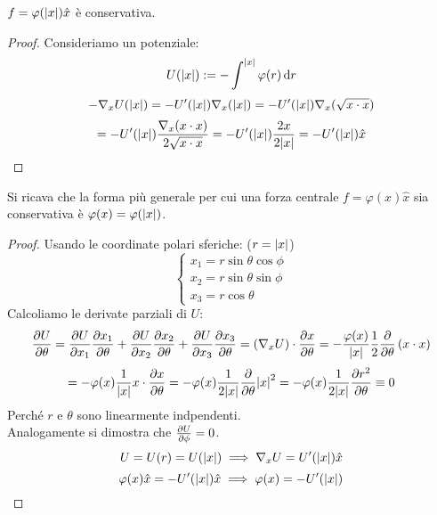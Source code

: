 \begin{proposition}
    $f= \varphi(\abs{x})\hat{x}$ è conservativa.    
\end{proposition}
\begin{proof}
    Consideriamo un potenziale:
    \begin{equation}
        U(\abs{x}):=-\int^\abs{x}\varphi(r)\dd{r}
    \end{equation}
    \begin{equation*}
        -\nabla_x U(\abs{x}) = -U'(\abs{x}) \nabla_x (\abs{x}) = -U'(\abs{x}) \nabla_x (\sqrt{x \cdot x}) 
    \end{equation*}
    \begin{equation*}
        = -U'(\abs{x}) \frac{\nabla_x (x \cdot x)}{2 \sqrt{x \cdot x}} = -U'(\abs{x}) \frac{2x}{2 \abs{x}} = -U'(\abs{x}) \hat{x}
\end{equation*}
\end{proof}

\begin{remark}
    Si ricava che la forma più generale per cui una forza centrale $f= \varphi(x)\hat{x}$ sia conservativa è $\varphi(x)=\varphi(\abs{x})$.
\end{remark}
\begin{proof}
    Usando le coordinate polari sferiche:     ($r = \abs{x}$)
    \begin{equation}
        \begin{cases}
            x_1 = r \sin\theta \cos\phi \\
            x_2 = r \sin\theta \sin\phi \\
            x_3 = r \cos\theta 
        \end{cases}
    \end{equation}
    Calcoliamo le derivate parziali di $U$:
    \begin{equation*}
        \pdv{U}{\theta}= \pdv{U}{x_1}\pdv{x_1}{\theta}+\pdv{U}{x_2}\pdv{x_2}{\theta}+\pdv{U}{x_3}\pdv{x_3}{\theta}=
         \left( \nabla_xU \right)\cdot\pdv{x}{\theta}= -\frac{\varphi(x)}{\abs{x}}\frac{1}{2}\pdv{\theta}\left( x\cdot x \right)
    \end{equation*}
    \begin{equation}
        =-\varphi(x)\frac{1}{\abs{x}}x\cdot \pdv{x}{\theta}= - \varphi(x)\frac{1}{2\abs{x}}\pdv{\theta}\abs{x}^2
        =- \varphi(x)\frac{1}{2\abs{x}}\pdv{r^2}{\theta}\equiv0 
    \end{equation}
    Perché $r$ e $\theta$ sono linearmente indpendenti.\\
    Analogamente si dimostra che $\pdv{U}{\phi}=0$.
    \begin{equation*}
        U = U(r) = U(\abs{x})\implies \nabla_xU= U'(\abs{x})\hat{x}
    \end{equation*}
    \begin{equation*}
        \varphi(x)\hat{x}=-U'(\abs{x})\hat{x}\implies \varphi(x)= -U'(\abs{x})
    \end{equation*}
\end{proof}

